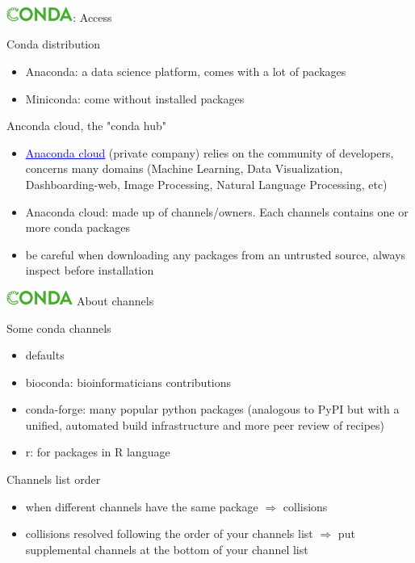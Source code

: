 \begin{frame}{\includegraphics[height=0.5cm]{shared/logo-conda.png}: Access}
\begin{block}{Conda distribution}
\begin{itemize}
        \item Anaconda: a data science platform, comes with a lot of packages
        \item Miniconda: come without installed packages
\end{itemize}
\end{block}
\begin{block}{Anconda cloud, the "conda hub"}
\begin{itemize}
    \item \href{http://anaconda.org/}{\textcolor{blue}{\underline{Anaconda cloud}}}
    (private company) relies on the community of developers, concerns many domains (Machine Learning, Data Visualization, Dashboarding-web, Image Processing, Natural Language Processing, etc)
    \item Anaconda cloud: made up of channels/owners. Each channels contains one or more conda packages 
    \item be careful when downloading any packages from an untrusted source, always inspect before installation
\end{itemize}
\end{block}
\end{frame}
\begin{frame}{\includegraphics[height=0.5cm]{shared/logo-conda.png} About channels}
\begin{block}{Some conda channels}
\begin{itemize}
    \item defaults
    \item bioconda: bioinformaticians contributions
    \item conda-forge: many popular python packages (analogous to PyPI but with a unified, automated build infrastructure and more peer review of recipes)
    \item r: for packages in R language
\end{itemize}

\end{block}
\begin{block}{Channels list order}
\begin{itemize}
    \item when different channels have the same package $\Rightarrow$ collisions
    \item collisions resolved following the order of your channels list $\Rightarrow$ put supplemental channels at the bottom of your channel list
\end{itemize}
\end{block}
\end{frame}
